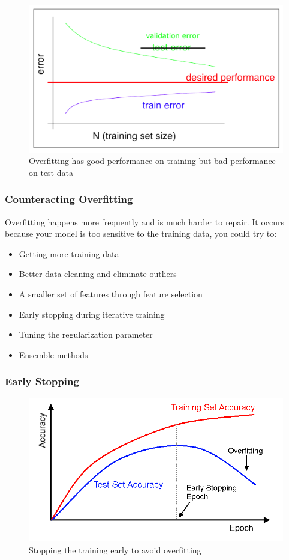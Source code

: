 \documentclass[11pt]{article}
\begin{document}
\begin{figure}[h!]
    \centering
    \includegraphics[width=0.7\linewidth, keepaspectratio]{Pictures/overfitting_learning_curve}
    \caption{Overfitting has good performance on training but bad performance on test data}
    \label{fig:overfittinglearningcurve}
\end{figure}

\subsubsection{Counteracting Overfitting}
Overfitting happens more frequently and is much harder to repair. It occurs because your model is too sensitive to the training data, you could try to:
\begin{itemize}
    \item Getting more training data
    \item Better data cleaning and eliminate outliers
    \item A smaller set of features through feature selection
    \item Early stopping during iterative training
    \item Tuning the regularization parameter
    \item Ensemble methods
\end{itemize}

\subsubsection{Early Stopping}

\begin{figure}[h!]
    \centering
    \includegraphics[width=0.6\linewidth, keepaspectratio]{Pictures/early_stopping}
    \caption{Stopping the training early to avoid overfitting}
    \label{fig:earlystopping}
\end{figure}
\end{document}
